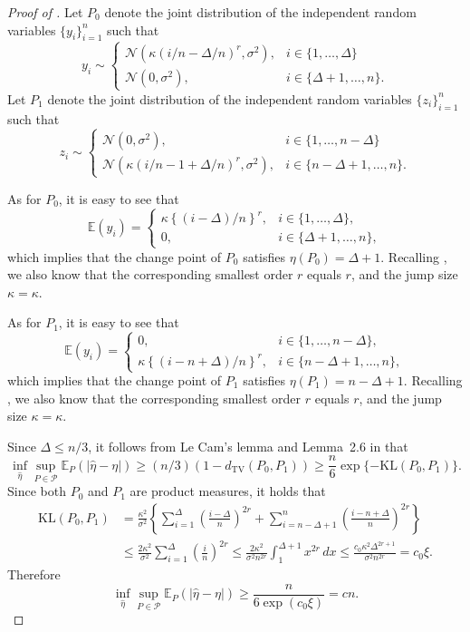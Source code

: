 \documentclass{article}
\begin{document}
\begin{proof}[Proof of ]
Let $P_0$ denote the joint distribution of the independent random variables $\{y_i\}_{i = 1}^n$ such that
	\[
		y_i \sim \begin{cases}
 			\mathcal{N}(\kappa (i/n - \Delta/n)^r, \sigma^2), & i \in \{1, \ldots, \Delta\} \\
 			\mathcal{N}(0, \sigma^2), & i \in \{\Delta + 1, \ldots, n\}. 
 		\end{cases}
	\]
	Let $P_1$ denote the joint distribution of the independent random variables $\{z_i\}_{i = 1}^n$ such that
	\[
		z_i \sim \begin{cases}
 			\mathcal{N}(0, \sigma^2), & i \in \{1, \ldots, n-\Delta\} \\
 			\mathcal{N}(\kappa (i/n - 1 + \Delta/n)^r, \sigma^2), & i \in \{n- \Delta + 1, \ldots, n\}. 
 		\end{cases}
	\]
	
As for $P_0$, it is easy to see that 
	\[
		\mathbb{E}(y_i) = \begin{cases}
 			\kappa \left\{(i-\Delta)/n\right\}^r, & i \in \{1, \ldots, \Delta\}, \\
 			0, & i \in \{\Delta + 1, \ldots, n\},
 		\end{cases}
	\]
	which implies that the change point of $P_0$ satisfies $\eta(P_0) = \Delta + 1$.  Recalling , we also know that the corresponding smallest order $r$ equals $r$, and the jump size $\kappa = \kappa$. 

As for $P_1$, it is easy to see that 
	\[
		\mathbb{E}(y_i) = \begin{cases}
 			0, & i \in \{1, \ldots, n-\Delta\}, \\
 			\kappa \left\{(i-n+\Delta)/n\right\}^r, & i \in \{n-\Delta + 1, \ldots, n\},
 		\end{cases}
	\]
	which implies that the change point of $P_1$ satisfies $\eta(P_1) = n-\Delta + 1$.  Recalling , we also know that the corresponding smallest order $r$ equals $r$, and the jump size $\kappa = \kappa$. 
	
Since $\Delta \leq n/3$, it follows from Le Cam's lemma \citep[e.g.][]{yu1997assouad} and Lemma~2.6 in \cite{Tsybakov2009} that
	\[
		\inf_{\widehat{\eta}} \sup_{P \in \mathcal{P}} \mathbb{E}_P(|\widehat{\eta} - \eta|) \geq (n/3) (1 - d_{\mathrm{TV}} (P_0, P_1)) \geq \frac{n}{6} \exp\{-\mathrm{KL}(P_0, P_1)\}.
	\]
	Since both $P_0$ and $P_1$ are product measures, it holds that
	\begin{align*}
		\mathrm{KL}(P_0, P_1) & = \frac{\kappa^2}{\sigma^2} \left\{\sum_{i = 1}^{\Delta} \left(\frac{i-\Delta}{n}\right)^{2r} + \sum_{i = n-\Delta + 1}^n \left(\frac{i-n+\Delta}{n}\right)^{2r}\right\} \\
		& \leq \frac{2\kappa^2}{\sigma^2}\sum_{i = 1}^{\Delta} \left(\frac{i}{n}\right)^{2r} \leq \frac{2\kappa^2}{\sigma^2 n^{2r}} \int_1^{\Delta+1} x^{2r}\, dx \leq \frac{c_0\kappa^2 \Delta^{2r+1}}{\sigma^2 n^{2r}} = c_0\xi.
	\end{align*}
	Therefore
	\[
		\inf_{\hat{\eta}} \sup_{P \in \mathcal{P}} \mathbb{E}_P(|\hat{\eta} - \eta|) \geq \frac{n}{6\exp(c_0 \xi)} = cn.
	\]

\end{proof}
\end{document}
